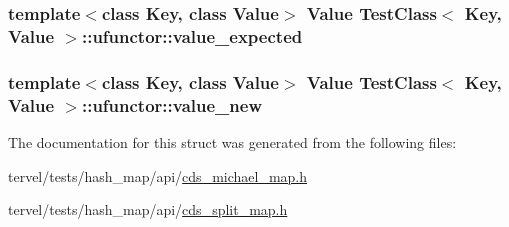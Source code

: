\subsubsection[{value\+\_\+expected}]{\setlength{\rightskip}{0pt plus 5cm}template$<$class Key, class Value$>$ {\bf Value} {\bf Test\+Class}$<$ Key, {\bf Value} $>$\+::ufunctor\+::value\+\_\+expected}\label{struct_test_class_1_1ufunctor_a7bd0f4a31fe5da27398cb0131c96a24f}
\hypertarget{struct_test_class_1_1ufunctor_a4c5053777eaa7f62544ce25386ef693c}{}
\subsubsection[{value\+\_\+new}]{\setlength{\rightskip}{0pt plus 5cm}template$<$class Key, class Value$>$ {\bf Value} {\bf Test\+Class}$<$ Key, {\bf Value} $>$\+::ufunctor\+::value\+\_\+new}\label{struct_test_class_1_1ufunctor_a4c5053777eaa7f62544ce25386ef693c}


The documentation for this struct was generated from the following files\+:\begin{DoxyCompactItemize}
\item 
tervel/tests/hash\+\_\+map/api/\hyperlink{cds__michael__map_8h}{cds\+\_\+michael\+\_\+map.\+h}\item 
tervel/tests/hash\+\_\+map/api/\hyperlink{cds__split__map_8h}{cds\+\_\+split\+\_\+map.\+h}\end{DoxyCompactItemize}
